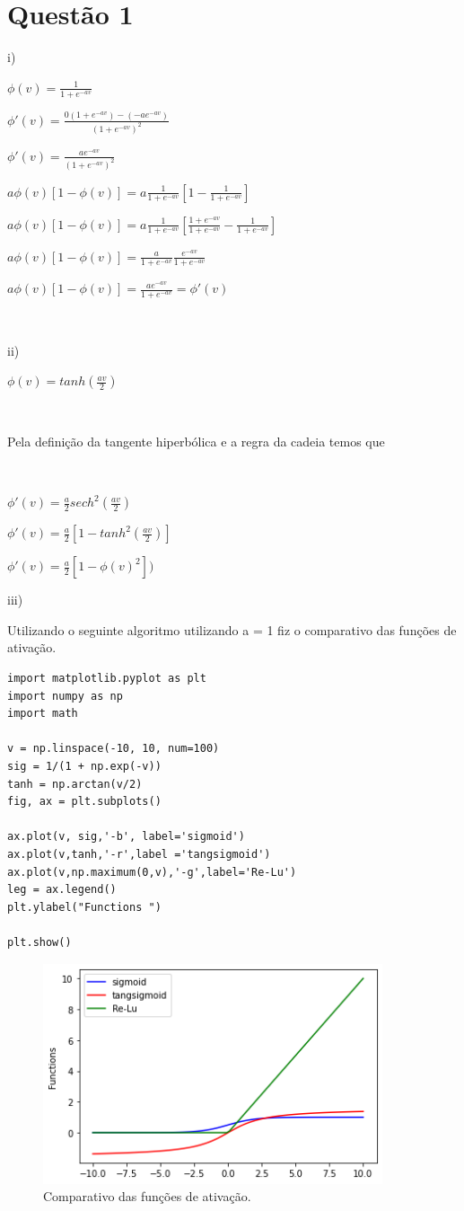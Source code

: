 \documentclass[a4paper, 12pt]{article}
\begin{document}
\section{Questão 1}

i)


$\phi (v) = \frac{1}{1+e^{-av}}$

$\phi' (v) = \frac{0(1+e^{-av})-(-ae^{-av})}{(1+e^{-av})^2}$

$\phi' (v) = \frac{ae^{-av}}{(1+e^{-av})^2}$

$a\phi(v) [1-\phi(v)] = a \frac{1}{1+e^{-av}}[1- \frac{1}{1+e^{-av}} ]$

$a\phi(v) [1-\phi(v)] = a \frac{1}{1+e^{-av}}[\frac{1+e^{-av}}{1+e^{-av}}- \frac{1}{1+e^{-av}} ]$

$a\phi(v) [1-\phi(v)]=\frac{a}{1+e^{-av}}\frac{e^{-av}}{1+e^{-av}}$

$a\phi(v) [1-\phi(v)]=\frac{ae^{-av}}{1+e^{-av}} = \phi'(v)$

\

ii)

$\phi(v) = tanh(\frac{av}{2})$

\

Pela definição da tangente hiperbólica e a regra da cadeia temos que 

\

$\phi'(v)=\frac{a}{2}sech^2(\frac{av}{2})$


$\phi'(v)=\frac{a}{2}[1-tanh^2(\frac{av}{2})]$

$\phi'(v)=\frac{a}{2}[1-\phi(v)^2])$

iii)

Utilizando o seguinte algoritmo utilizando a = 1 fiz o comparativo das funções de ativação.


\begin{lstlisting}[style=CStyle]
import matplotlib.pyplot as plt 
import numpy as np 
import math 
  
v = np.linspace(-10, 10, num=100) 
sig = 1/(1 + np.exp(-v)) 
tanh = np.arctan(v/2)
fig, ax = plt.subplots()

ax.plot(v, sig,'-b', label='sigmoid') 
ax.plot(v,tanh,'-r',label ='tangsigmoid')
ax.plot(v,np.maximum(0,v),'-g',label='Re-Lu')
leg = ax.legend()
plt.ylabel("Functions ") 
  
plt.show() 
\end{lstlisting}
\begin{figure}[H]
    \centering
    \includegraphics[width=10cm]{figuras/plots.png}
    \caption{Comparativo das funções de ativação.}
    \label{fig:plot1}
\end{figure}
\end{document}
